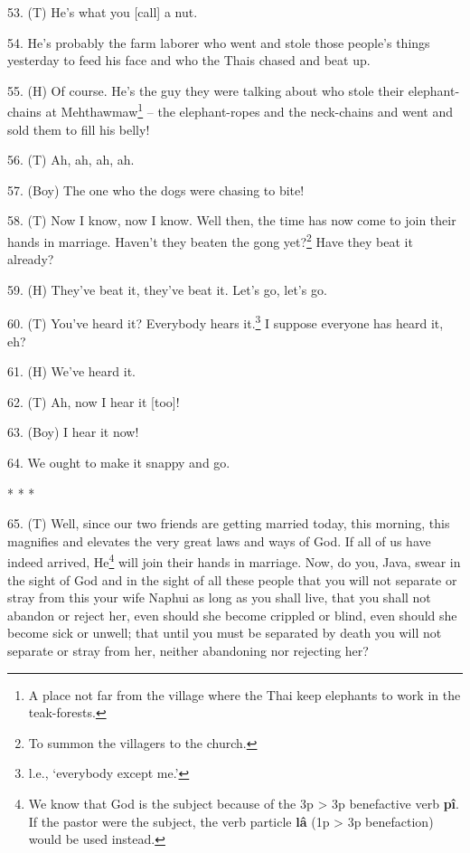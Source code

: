 53. (T) He's what you [call] a nut.

54. He's probably the farm laborer who went and stole those people's things yesterday
to feed his face and who the Thais chased and beat up.

55. (H) Of course. He's the guy they were talking about who stole their elephant-chains
at Mehthawmaw\footnote{A place not far from the village where the Thai keep elephants to work in the teak-forests.} -- the elephant-ropes and the neck-chains and went and sold them
to fill his belly!

56. (T) Ah, ah, ah, ah.

57. (Boy) The one who the dogs were chasing to bite!

58. (T) Now I know, now I know. Well then, the time has now come to join their
hands in marriage. Haven't they beaten the gong yet?\footnote{To summon the villagers to the church.} Have they beat it already?

59. (H) They've beat it, they've beat it. Let's go, let's go.

60. (T) You've heard it? Everybody hears it.\footnote{l.e., `everybody except me.'} I suppose everyone has heard it,
eh?

61. (H) We've heard it.

62. (T) Ah, now I hear it [too]!

63. (Boy) I hear it now!

64. We ought to make it snappy and go.

\begin{center}
* * *

\end{center}

65. (T) Well, since our two friends are getting married today, this morning, this
magnifies and elevates the very great laws and ways of God. If all of us have indeed
arrived, He\footnote{We know that God is the subject because of the 3p > 3p benefactive verb \textbf{pî}. If the pastor were the subject, the verb particle \textbf{lâ} (1p > 3p benefaction) would be used instead.} will join their hands in marriage. Now, do you, Java, swear in
the sight of God and in the sight of all these people that you will not separate
or stray from this your wife Naphui as long as you shall live, that you shall not
abandon or reject her, even should she become crippled or blind, even should she
become sick or unwell; that until you must be separated by death you will not separate
or stray from her, neither abandoning nor rejecting her?


